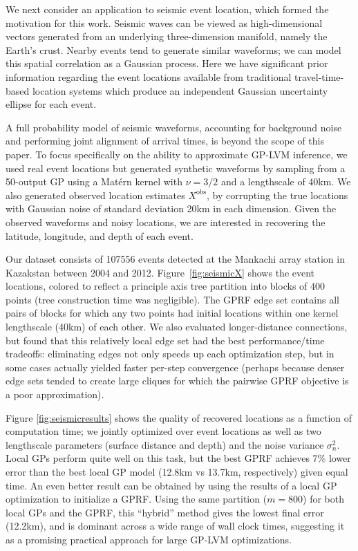 \documentclass{article}
\begin{document}
We next consider an application to seismic event location, which formed the
motivation for this work. Seismic waves can be
viewed as high-dimensional vectors generated from an
underlying three-dimension manifold, namely the Earth's
crust. Nearby events tend to generate similar waveforms; we
can model this spatial correlation as a Gaussian process. Here we have significant prior information regarding the event
locations available from traditional travel-time-based location systems
\cite{ISCcitation2015} which produce an independent Gaussian uncertainty ellipse for each event.

A full probability model of seismic waveforms, accounting for background
noise and performing joint alignment of arrival times, is beyond the scope of this
paper. To focus specifically on the ability to approximate GP-LVM inference, we
used real event locations but generated synthetic waveforms  by sampling from a 50-output GP using a Mat\'ern kernel
\cite{rasmussen2006} with $\nu=3/2$ and a lengthscale of 40km. We also
generated observed location estimates $X^\text{obs}$, by corrupting the
true locations with Gaussian noise of standard deviation
20km in each dimension. Given the
observed waveforms and noisy locations, we are interested in recovering the
latitude, longitude, and depth of each event.

Our dataset consists of 107556 events detected at the Mankachi array
station in Kazakstan between 2004 and 2012. Figure~\ref{fig:seismicX}
shows the event locations, colored to reflect a principle axis tree
\cite{mcnames2001fast} partition into blocks of $400$ points (tree construction time was
negligible). The GPRF edge set contains all pairs of
blocks for which any two points had initial locations within one
kernel lengthscale (40km) of each other. We also evaluated
longer-distance connections, but found that this relatively local
edge set had the best performance/time tradeoffs: eliminating edges not
only speeds up each optimization step, but in some cases actually
yielded faster per-step convergence (perhaps because denser edge sets
tended to create large cliques for which the pairwise GPRF objective is
a poor approximation).

Figure \ref{fig:seismicresults} shows the quality of recovered locations as a
function of computation time; we jointly optimized over event locations as
well as two lengthscale parameters (surface distance
and depth) and the noise variance $\sigma^2_n$. Local GPs 
perform quite well on this task, but the best
GPRF achieves 7\% lower error than the best local
GP model (12.8km vs 13.7km, respectively) given equal time. An even
better result can be obtained by using the results of a local GP
optimization to initialize a GPRF. Using the same
partition ($m=800$) for both local GPs and the GPRF, this ``hybrid'' method
gives the lowest final error (12.2km), and is dominant across a wide
range of wall clock times, suggesting it as a promising
practical approach for large GP-LVM optimizations. 
\vspace{-0.3cm}
\end{document}
